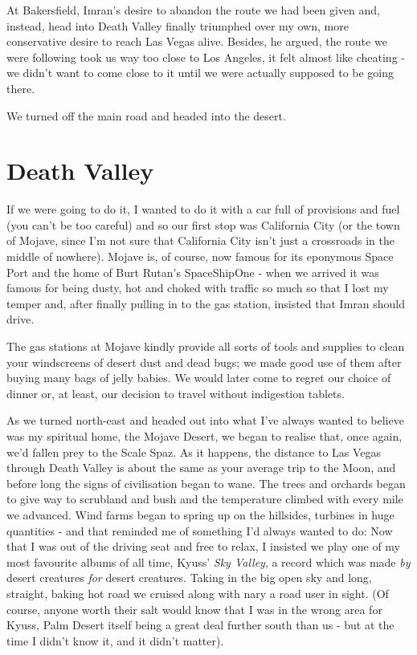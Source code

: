 \documentclass[a5paper,titlepage,draft]{book}
\begin{document}
At Bakersfield, Imran's desire to abandon the route we had been given and, instead, head into Death Valley finally triumphed over my own, more conservative desire to reach Las Vegas alive.  Besides, he argued, the route we were following took us way too close to Los Angeles, it felt almost like cheating - we didn't want to come close to it until we were actually supposed to be going there.

We turned off the main road and headed into the desert.

\section*{Death Valley}
If we were going to do it, I wanted to do it with a car full of provisions and fuel (you can't be too careful) and so our first stop was California City (or the town of Mojave, since I'm not sure that California City isn't just a crossroads in the middle of nowhere).  Mojave is, of course, now famous for its eponymous Space Port and the home of Burt Rutan's SpaceShipOne - when we arrived it was famous for being dusty, hot and choked with traffic so much so that I lost my temper and, after finally pulling in to the gas station, insisted that Imran should drive.

The gas stations at Mojave kindly provide all sorts of tools and supplies to clean your windscreens of desert dust and dead bugs; we made good use of them after buying many bags of jelly babies.  We would later come to regret our choice of dinner or, at least, our decision to travel without indigestion tablets.

As we turned north-east and headed out into what I've always wanted to believe was my spiritual home, the Mojave Desert, we began to realise that, once again, we'd fallen prey to the Scale Spaz.  As it happens, the distance to Las Vegas through Death Valley is about the same as your average trip to the Moon, and before long the signs of civilisation began to wane.  The trees and orchards began to give way to scrubland and bush and the temperature climbed with every mile we advanced.  Wind farms began to spring up on the hillsides, turbines in huge quantities - and that reminded me of something I'd always wanted to do:  Now that I was out of the driving seat and free to relax, I insisted we play one of my most favourite albums of all time, Kyuss' \emph{Sky Valley}, a record which was made \emph{by} desert creatures \emph{for} desert creatures.  Taking in the big open sky and long, straight, baking hot road we cruised along with nary a road user in sight.  (Of course, anyone worth their salt would know that I was in the wrong area for Kyuss, Palm Desert itself being a great deal further south than us - but at the time I didn't know it, and it didn't matter).
\end{document}
